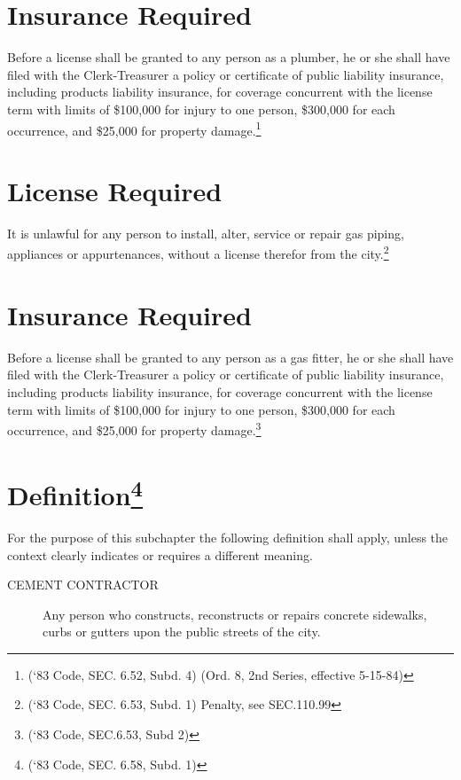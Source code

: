 \section{Insurance Required}
Before a license shall be granted to any person as a plumber, he or she shall have filed with the Clerk-Treasurer a policy or certificate of public liability insurance, including products liability insurance, for coverage concurrent with the license term with limits of \$100,000 for injury to one person, \$300,000 for each occurrence, and \$25,000 for property damage.\footnote{(‘83 Code, SEC. 6.52, Subd. 4)  (Ord. 8, 2nd Series, effective 5-15-84)}


\setcounter{section}{14}
\section{License Required}
It is unlawful for any person to install, alter, service or repair gas piping, appliances or appurtenances, without a license therefor from the city.\footnote{(‘83 Code, SEC. 6.53, Subd. 1) Penalty, see SEC.110.99}

\section{Insurance Required}
Before a license shall be granted to any person as a gas fitter, he or she shall have filed with the Clerk-Treasurer a policy or certificate of public liability insurance, including products liability insurance, for coverage concurrent with the license term with limits of \$100,000 for injury to one person, \$300,000 for each occurrence, and \$25,000 for property damage.\footnote{(‘83 Code, SEC.6.53, Subd 2)}


\setcounter{section}{29}
\section{Definition\footnote{(‘83 Code, SEC. 6.58, Subd. 1)}}
For the purpose of this subchapter the following definition shall apply, unless the context clearly indicates or requires a different meaning.
\begin{description}
    \item[CEMENT CONTRACTOR] Any person who constructs, reconstructs or repairs concrete sidewalks, curbs or gutters upon the public streets of the city.
\end{description}


